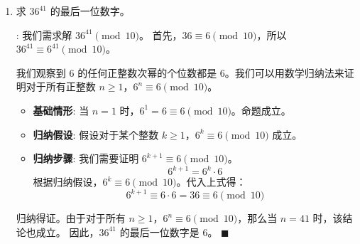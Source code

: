 \documentclass[11pt]{article}
\newenvironment{qparts}{\begin{enumerate}[{(}a{)}]}{\end{enumerate}}
\def\endproofmark{$\blacksquare$}
\newenvironment{proof}{\par\noindent{\bf 证明}:}{\endproofmark\smallskip}
\begin{document}
\begin{qparts}
\begin{proof}
由于指数 $99999$ 是一个奇数，我们可以将其写成 $2k+1$ 的形式（其中 $k=49999$）。
\[ 9^{99999} = 9^{2k+1} = (9^2)^k \cdot 9^1 \equiv 1^k \cdot 9 \equiv 9 \pmod{10} \]
因此，$9^{99999}$ 的最后一位数字是 $9$。
\end{proof}

\item 求 $36^{41}$ 的最后一位数字。

\begin{proof}
我们需求解 $36^{41} \pmod{10}$。
首先，$36 \equiv 6 \pmod{10}$，所以 $36^{41} \equiv 6^{41} \pmod{10}$。

我们观察到 $6$ 的任何正整数次幂的个位数都是 $6$。我们可以用数学归纳法来证明对于所有正整数 $n \ge 1$，$6^n \equiv 6 \pmod{10}$。
\begin{itemize}
    \item \textbf{基础情形}: 当 $n=1$ 时，$6^1 = 6 \equiv 6 \pmod{10}$。命题成立。
    \item \textbf{归纳假设}: 假设对于某个整数 $k \ge 1$，$6^k \equiv 6 \pmod{10}$ 成立。
    \item \textbf{归纳步骤}: 我们需要证明 $6^{k+1} \equiv 6 \pmod{10}$。
    \[ 6^{k+1} = 6^k \cdot 6 \]
    根据归纳假设，$6^k \equiv 6 \pmod{10}$。代入上式得：
    \[ 6^{k+1} \equiv 6 \cdot 6 = 36 \equiv 6 \pmod{10} \]
\end{itemize}
归纳得证。由于对于所有 $n \ge 1$，$6^n \equiv 6 \pmod{10}$，那么当 $n=41$ 时，该结论也成立。
因此，$36^{41}$ 的最后一位数字是 $6$。
\end{proof}
\end{qparts}

\newpage

\end{document}
